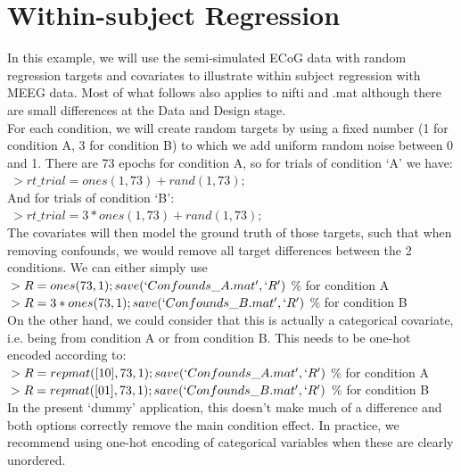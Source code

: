 
\chapter{Within-subject Regression}
\label{within_subject_regression}
\minitoc

In this example, we will use the semi-simulated ECoG data with random regression targets and covariates to illustrate within subject regression with MEEG data. Most of what follows also applies to nifti and .mat although there are small differences at the Data and Design stage.
\\

For each condition, we will create random targets by using a fixed number (1 for condition A, 3 for condition B) to which we add uniform random noise between 0 and 1. There are 73 epochs for condition A, so for trials of condition `A' we have:
\\

$\>> rt\_trial = ones(1,73)+rand(1,73);$
\\

And for trials of condition `B':
\\

$\>> rt\_trial = 3*ones(1,73)+rand(1,73);$
\\

The covariates will then model the ground truth of those targets, such that when removing confounds, we would remove all target differences between the 2 conditions. We can either simply use
\\

$\>> R = ones(73,1); save(`Confounds\_A.mat',`R')$ \% for condition A
\\

$\>> R = 3*ones(73,1); save(`Confounds\_B.mat',`R')$ \% for condition B
\\

On the other hand, we could consider that this is actually a categorical covariate, i.e. being from condition A or from condition B. This needs to be one-hot encoded according to:
\\

$\>> R = repmat([1 0],73,1); save(`Confounds\_A.mat',`R')$ \% for condition A
\\

$\>> R = repmat([0 1],73,1); save(`Confounds\_B.mat',`R')$ \% for condition B
\\

In the present `dummy' application, this doesn’t make much of a difference and both options correctly remove the main condition effect. In practice, we recommend using one-hot encoding of categorical variables when these are clearly unordered.


